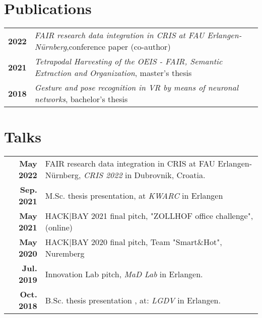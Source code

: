 \documentclass[michiscolours]{hipstercv}
\begin{document}
\begin{paracol}{2}

\small
\section*{Publications}
\begin{tabular}{>{\footnotesize\bfseries}r >{\footnotesize}p{}}
   2022 &\emph{FAIR research data integration in CRIS at FAU Erlangen-Nürnberg},\newline conference paper (co-author) \\
    2021 & \emph{Tetrapodal Harvesting of the OEIS - FAIR, Semantic Extraction and Organization}, \newline master's thesis \\
    2018 & \emph{Gesture and pose recognition in VR by means of neuronal networks}, bachelor's thesis 
\end{tabular}
\section*{Talks}
\begin{tabular}{>{\footnotesize\bfseries}r >{\footnotesize}p{}}
   May 2022& FAIR research data integration in CRIS at FAU Erlangen-Nürnberg, \newline \emph{CRIS 2022} in Dubrovnik, Croatia. \\
    Sep. 2021& M.Sc. thesis presentation, at \emph{KWARC} in Erlangen \\
    May 2021& HACK|BAY 2021 final pitch, "ZOLLHOF office challenge",  (online) \\
    May 2020& HACK|BAY 2020 final pitch, Team "Smart\&Hot", Nuremberg \\
    Jul. 2019& Innovation Lab pitch, \emph{MaD Lab} in Erlangen.\\
    Oct. 2018& B.Sc. thesis presentation , at: \emph{LGDV} in Erlangen. \\
\end{tabular}



\end{paracol}
\end{document}
